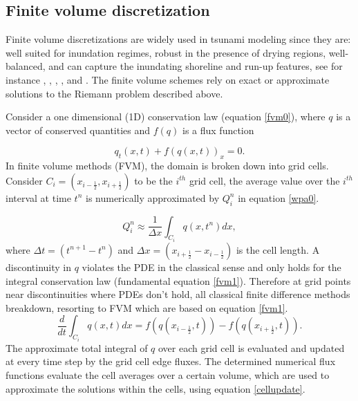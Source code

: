 \documentclass[10pt,a4paper]{article}
\begin{document}
	\subsection{Finite volume discretization}
	Finite volume discretizations are widely used in tsunami modeling since they are: well suited for inundation regimes, robust in the presence of drying regions, well-balanced, and can capture the inundating shoreline and run-up features, see for instance   \citet{ge:2008,ge:2011,george2006finite}, \citet{be-ge-le-ma:2011}, \citet{bi2014finite}, \citet{leveque2002finite}, and \citet{ba-le-mi-ro:2003}. The finite volume schemes rely on exact or approximate solutions to the Riemann problem described above.  
	
	Consider a one dimensional (1D) conservation law  (equation \eqref{fvm0}),  where $q$ is a vector of conserved quantities and $f(q)$ is a flux function
	
	\begin{equation}
		q_{t}(x,t) + f(q(x,t))_{x} = 0.
		\label{fvm0}
	\end{equation}	
	In finite volume methods (FVM), the domain is broken down into grid cells. Consider $C_{i} = (x_{i-\frac{1}{2}},x_{i+\frac{1}{2}})$ to be the $i^{th}$ grid cell, the average value over the $i^{th}$ interval at time $t^{n}$ is numerically approximated by $Q_{i}^{n}$ in equation \eqref{wpa0}.
	
	\begin{equation}
		Q_{i}^{n} \approx \dfrac{1}{\Delta x} \int_{C_{i}}q(x,t^{n})dx,
		\label{wpa0}
	\end{equation}
	where $\Delta t = (t^{n+1} - t^{n})$ and  $\Delta x = (x_{i+\frac{1}{2}} - x_{i-\frac{1}{2}})$ is the cell length. A discontinuity in $q$ violates the PDE in the classical sense and only holds for the integral conservation law (fundamental equation \eqref{fvm1}). Therefore at grid points near discontinuities where PDEs don't hold, all classical finite difference methods breakdown, resorting to FVM which are based on equation \eqref{fvm1}. 	
	\begin{equation}
		\frac{d}{dt} \int_{C_{i}} q(x,t)dx = f(q(x_{i-\frac{1}{2}},t)) -  f(q(x_{i+\frac{1}{2}},t)).
		\label{fvm1}
	\end{equation}	
	The approximate  total integral of $q$ over each grid cell is evaluated and updated at every time step by the grid cell edge fluxes. The determined numerical flux functions evaluate the  cell averages over a certain volume, which are used to approximate the solutions within the cells, using equation \eqref{cellupdate}.
	
\end{document}
